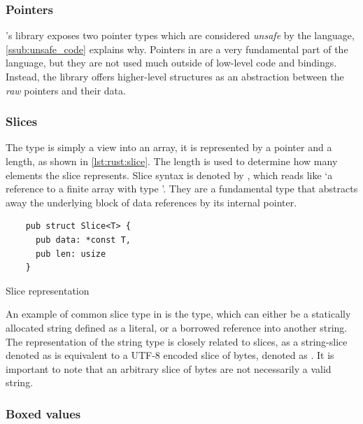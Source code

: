 \subsubsection{Pointers}

\rust's {\core} library exposes two pointer types which are considered \emph{unsafe} by the language, \autoref{ssub:unsafe_code} explains why.
Pointers in {\rust} are a very fundamental part of the language, but they are not used much outside of low-level code and bindings.
Instead, the library offers higher-level structures as an abstraction between the \emph{raw} pointers and their data.

\subsubsection{Slices}

The  type is simply a view into an array, it is represented by a pointer and a length, as shown in \autoref{lst:rust:slice}.
The length is used to determine how many elements the slice represents.
Slice syntax is denoted by \code{\&[T]}, which reads like `a reference to a finite array with type '.
They are a fundamental type that abstracts away the underlying block of data references by its internal pointer.

\begin{listing}[H]
  \begin{verbatim}
    pub struct Slice<T> {
      pub data: *const T,
      pub len: usize
    }
\end{verbatim}
\caption{Slice representation}
\label{lst:rust:slice}
\end{listing}

An example of common slice type in {\rust} is the  type, which can either be a statically allocated string defined as a literal, or a borrowed reference into another string.
The representation of the string type is closely related to slices, as a string-slice denoted as  is equivalent to a UTF-8 encoded slice of bytes, denoted as \code{\&[u8]}.
It is important to note that an arbitrary slice of bytes are not necessarily a valid string.

\subsubsection{Boxed values}

